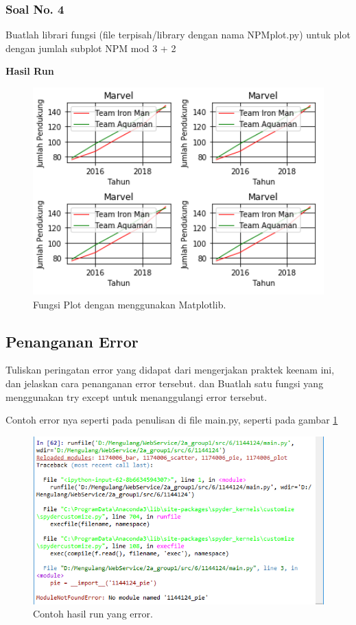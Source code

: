 \subsubsection{Soal No. 4}
\hfill \break
Buatlah librari fungsi (file terpisah/library dengan nama NPMplot.py) untuk plot dengan jumlah subplot NPM mod 3 + 2



\hfill \break
\textbf{Hasil Run}

\begin{figure}[H]
	\includegraphics[width=12cm]{figures/6/1144124/d.png}
	\centering
	\caption{Fungsi Plot dengan menggunakan Matplotlib.}
\end{figure}

\subsection{Penanganan Error}
Tuliskan  peringatan  error  yang  didapat  dari  mengerjakan  praktek  keenam  ini, dan  jelaskan  cara  penanganan  error  tersebut. dan  Buatlah  satu  fungsi  yang menggunakan try except untuk menanggulangi error tersebut.

\hfill \break
Contoh error nya seperti pada penulisan di file main.py, seperti pada gambar \ref{error}
\begin{figure}[H]
	\includegraphics[width=12cm]{figures/6/1144124/error.png}
	\centering
	\caption{Contoh hasil run yang error.}
    \label{error}
\end{figure}


